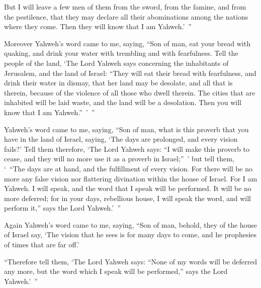 {But I will leave a few men of them from the sword, from the famine, and from the pestilence, that they may declare all their abominations among the nations where they come. Then they will know that I am Yahweh.’ ”
\par }{\PP {}Moreover Yahweh’s word came to me, saying,
“Son of man, eat your bread with quaking, and drink your water with trembling and with fearfulness.
Tell the people of the land, ‘The Lord Yahweh says concerning the inhabitants of Jerusalem, and the land of Israel: “They will eat their bread with fearfulness, and drink their water in dismay, that her land may be desolate, and all that is therein, because of the violence of all those who dwell therein.
The cities that are inhabited will be laid waste, and the land will be a desolation. Then you will know that I am Yahweh.” ’ ”
\par }{\PP {}Yahweh’s word came to me, saying,
“Son of man, what is this proverb that you have in the land of Israel, saying, ‘The days are prolonged, and every vision fails?’
Tell them therefore, ‘The Lord Yahweh says: “I will make this proverb to cease, and they will no more use it as a proverb in Israel;” ’ but tell them, ‘ “The days are at hand, and the fulfillment of every vision.
For there will be no more any false vision nor flattering divination within the house of Israel.
For I am Yahweh. I will speak, and the word that I speak will be performed. It will be no more deferred; for in your days, rebellious house, I will speak the word, and will perform it,” says the Lord Yahweh.’ ”
\par }{\PP {}Again Yahweh’s word came to me, saying,
“Son of man, behold, they of the house of Israel say, ‘The vision that he sees is for many days to come, and he prophesies of times that are far off.’
\par }{\PP {}“Therefore tell them, ‘The Lord Yahweh says: “None of my words will be deferred any more, but the word which I speak will be performed,” says the Lord Yahweh.’ ”

}
